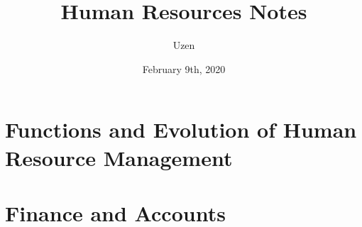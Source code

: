 \documentclass{report}
\title{Human Resources Notes}
\author{Uzen}
\date{February 9th, 2020}
\begin{document}
\maketitle
\newpage
\tableofcontents
\newpage

\chapter{Functions and Evolution of Human Resource Management}


\chapter{Finance and Accounts}

\end{document}
